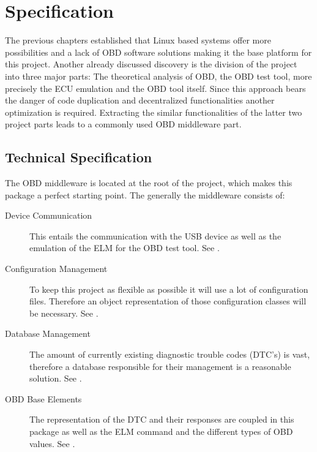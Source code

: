 

\chapter{Specification}
The previous chapters established that Linux based systems offer more possibilities and a lack of OBD software solutions making it the base platform 
for this project. Another already discussed discovery is the division of the project into three major parts: The theoretical analysis of OBD, the 
OBD test tool, more precisely the ECU emulation and the OBD tool itself. Since this approach bears the danger of code duplication and decentralized 
functionalities another optimization is required.  Extracting the similar functionalities of the latter two project parts leads to a 
commonly used OBD middleware part. 

\section{Technical Specification}
\label{sec:tecspec}
The OBD middleware is located at the root of the project, which makes this package a perfect starting point. The 
generally the middleware consists of:

\begin{description}
\item[Device Communication]

This entails the communication with the USB device as well as the emulation of the ELM for the OBD test tool. See .
\item[Configuration Management]

To keep this project as flexible as possible it will use a lot of configuration files. Therefore an object representation of those configuration 
classes will be necessary. See .
\item[Database Management]

The amount of currently existing diagnostic trouble codes (DTC’s) is vast, therefore a database responsible for their management is a reasonable 
solution. See .
\item[OBD Base Elements]

The representation of the DTC and their responses are coupled in this package as well as the ELM command and the different types of OBD values. 
See .
\end{description}

